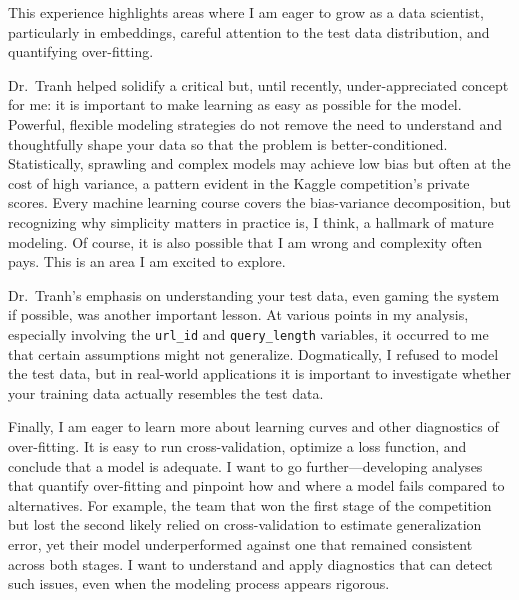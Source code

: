 \documentclass[
]{article}
\begin{document}
This experience highlights areas where I am eager to grow as a data
scientist, particularly in embeddings, careful attention to the test
data distribution, and quantifying over-fitting.

Dr.~Tranh helped solidify a critical but, until recently,
under-appreciated concept for me: it is important to make learning as
easy as possible for the model. Powerful, flexible modeling strategies
do not remove the need to understand and thoughtfully shape your data so
that the problem is better-conditioned. Statistically, sprawling and
complex models may achieve low bias but often at the cost of high
variance, a pattern evident in the Kaggle competition's private scores.
Every machine learning course covers the bias-variance decomposition,
but recognizing why simplicity matters in practice is, I think, a
hallmark of mature modeling. Of course, it is also possible that I am
wrong and complexity often pays. This is an area I am excited to
explore.

Dr.~Tranh's emphasis on understanding your test data, even gaming the
system if possible, was another important lesson. At various points in
my analysis, especially involving the \texttt{url\_id} and
\texttt{query\_length} variables, it occurred to me that certain
assumptions might not generalize. Dogmatically, I refused to model the
test data, but in real-world applications it is important to investigate
whether your training data actually resembles the test data.

Finally, I am eager to learn more about learning curves and other
diagnostics of over-fitting. It is easy to run cross-validation,
optimize a loss function, and conclude that a model is adequate. I want
to go further---developing analyses that quantify over-fitting and
pinpoint how and where a model fails compared to alternatives. For
example, the team that won the first stage of the competition but lost
the second likely relied on cross-validation to estimate generalization
error, yet their model underperformed against one that remained
consistent across both stages. I want to understand and apply
diagnostics that can detect such issues, even when the modeling process
appears rigorous.
\end{document}
